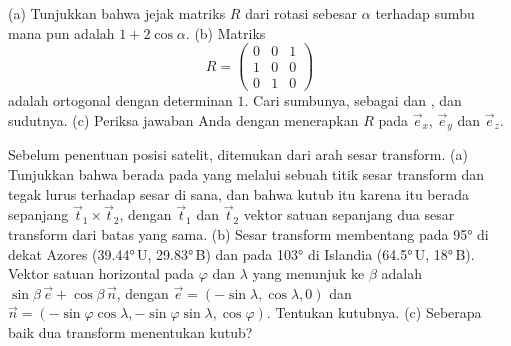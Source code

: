 \begin{exercise}[$\star\star\star$]\label{exo:b1:plate-kinematics:10}
(a) Tunjukkan bahwa jejak matriks $R$ dari rotasi sebesar $\alpha$ terhadap sumbu mana pun
adalah $1 + 2\cos\alpha$. (b) Matriks
\[
  R = \begin{pmatrix} 0 & 0 & 1\\ 1 & 0 & 0\\ 0 & 1 & 0\end{pmatrix}
\]
adalah ortogonal dengan determinan $1$. Cari sumbunya, sebagai  dan , dan sudutnya. (c) Periksa jawaban Anda dengan menerapkan $R$ pada $\vec e_x$, $\vec e_y$
dan $\vec e_z$.
\end{exercise}

\begin{exercise}[$\star\star\star$]\label{exo:b1:plate-kinematics:11}
Sebelum penentuan posisi satelit,  ditemukan dari arah sesar transform. (a) Tunjukkan bahwa  berada pada  yang melalui sebuah titik sesar transform dan tegak lurus terhadap sesar di sana, dan bahwa kutub itu karena itu berada sepanjang $\vec t_1\times\vec t_2$, dengan $\vec t_1$ dan $\vec t_2$ vektor satuan sepanjang dua sesar transform dari batas yang sama.
(b) Sesar transform membentang pada \ang{95} di dekat  Azores
(\ang{39.44}\,U, \ang{29.83}\,B) dan pada \ang{103} di Islandia (\ang{64.5}\,U,
\ang{18}\,B). Vektor satuan horizontal pada  $\varphi$ dan 
$\lambda$ yang menunjuk ke  $\beta$ adalah $\sin\beta\,\vec e +
\cos\beta\,\vec n$, dengan $\vec e = (-\sin\lambda, \cos\lambda, 0)$ dan $\vec n =
(-\sin\varphi\cos\lambda, -\sin\varphi\sin\lambda, \cos\varphi)$. Tentukan
kutubnya. (c) Seberapa baik dua transform menentukan kutub?
\end{exercise}

